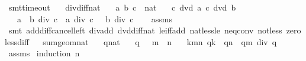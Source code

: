\begin{isabellebody}
\isamarkupfalse%
%
\endisatagproof
{\isafoldproof}%
%
\isadelimproof
\isanewline
%
\endisadelimproof
\isanewline
{}\isamarkupfalse%
\ {\isacharbrackleft}{\isacharbrackleft}smt{\isacharunderscore}timeout\ {\isacharequal}\ {}{}{\isacharbrackright}{\isacharbrackright}\isanewline
\isanewline
{}\isamarkupfalse%
\ div{\isacharunderscore}diff{\isacharunderscore}nat{\isacharcolon}\isanewline
\ \ \ a\ b\ c\ {\isacharcolon}{\isacharcolon}\ nat\isanewline
\ \ \ {\isachardoublequoteopen}c\ dvd\ a{\isachardoublequoteclose}\ {\isachardoublequoteopen}c\ dvd\ b{\isachardoublequoteclose}\isanewline
\ \ \ {\isachardoublequoteopen}{\isacharparenleft}a\ {\isacharminus}\ b{\isacharparenright}\ div\ c\ {\isacharequal}\ a\ div\ c\ \ {\isacharminus}\ b\ div\ c{\isachardoublequoteclose}\isanewline
%
\isadelimproof
\ \ %
\endisadelimproof
%
\isatagproof
{}\isamarkupfalse%
\ assms\isanewline
\ \ \isamarkupfalse%
\ {\isacharparenleft}smt\ add{\isacharunderscore}diff{\isacharunderscore}cancel{\isacharunderscore}left{\isacharprime}\ div{\isacharunderscore}add\ dvd{\isacharunderscore}diff{\isacharunderscore}nat\ le{\isacharunderscore}iff{\isacharunderscore}add\ nat{\isacharunderscore}less{\isacharunderscore}le\ neq{}{\isacharunderscore}conv\ not{\isacharunderscore}less\ zero{\isacharunderscore}less{\isacharunderscore}diff{\isacharparenright}%
\endisatagproof
{\isafoldproof}%
%
\isadelimproof
\ \isanewline
%
\endisadelimproof
\isanewline
{}\isamarkupfalse%
\ sum{\isacharunderscore}geom{\isacharunderscore}nat{\isacharprime}{\isacharcolon}\isanewline
\ \ \ q{\isacharcolon}{\isacharcolon}nat\isanewline
\ \ \ {\isachardoublequoteopen}q\ {\isachargreater}\ {}{\isachardoublequoteclose}\ {\isachardoublequoteopen}m\ {\isasymle}\ n{\isachardoublequoteclose}\isanewline
\ \ \ {\isachardoublequoteopen}{\isacharparenleft}{\isasymSum}k{\isasymin}{\isacharbraceleft}m{\isachardot}{\isachardot}{\isacharless}n{\isacharbraceright}{\isachardot}\ q{\isacharcircum}k{\isacharparenright}\ {\isacharequal}\ {\isacharparenleft}q{\isacharcircum}n\ {\isacharminus}\ q{\isacharcircum}m{\isacharparenright}\ div\ {\isacharparenleft}q\ {\isacharminus}\ {}{\isacharparenright}{\isachardoublequoteclose}\isanewline
%
\isadelimproof
\ \ %
\endisadelimproof
%
\isatagproof
{}\isamarkupfalse%
\ assms\isanewline
{}\isamarkupfalse%
\ {\isacharparenleft}induction\ n{\isacharparenright}\isanewline

\end{isabellebody}
